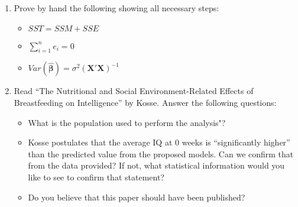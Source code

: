 \documentclass{article}
\begin{document}
\begin{enumerate}[Q 1.]
\item Prove by hand the following showing all necessary steps:
	\begin{itemize}
		\item $SST = SSM + SSE$
		\item $\sum_{i=1}^n e_i = 0$
		\item $Var({\bm{\hat\beta}}) = \sigma^2(\bm{X}'\bm{X})^{-1}$
	\end{itemize}
	
	
\item Read ``The Nutritional and Social Environment-Related Effects of Breastfeeding on Intelligence'' by Kosse. Answer the following questions:
	\begin{itemize}
		\item What is the population used to perform the analysis"?
		\item Kosse postulates that the average IQ at 0 weeks is ``significantly higher'' than the predicted value from the proposed models.  Can we confirm that from the data provided? If not, what statistical information would you like to see to confirm that statement?
		\item Do you believe that this paper should have been published?
	
	\end{itemize}
	
\end{enumerate}
\end{document}
